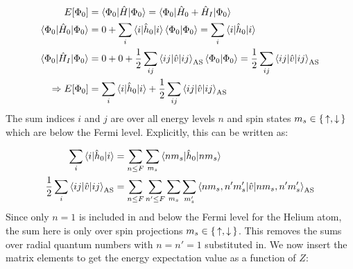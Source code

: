 \documentclass{article}
\newcommand{\inner}[3]{\braket{#1|#2|#3}}
\newcommand{\innerAS}[3]{\inner{#1}{#2}{#3}_{\text{AS}}}
\newcommand{\hnull}{\hat{h}_0}
\begin{document}
    \begin{align}
        E[\Phi_0] &= \inner{\Phi_0}{\hat{H}}{\Phi_0} = \inner{\Phi_0}{\hat{H}_0 + \hat{H}_I}{\Phi_0} \nonumber \\ 
        \inner{\Phi_0}{\hat{H}_0}{\Phi_0} &= 0 + \sum_i \inner{i}{\hnull}{i} \braket{\Phi_0 | \Phi_0} = \sum_i \inner{i}{\hnull}{i}\nonumber \\
        \inner{\Phi_0}{\hat{H}_I}{\Phi_0} &= 0 + 0 + \frac{1}{2}\sum_{ij} \innerAS{ij}{\hat{v}}{ij}\braket{\Phi_0|\Phi_0} = \frac{1}{2}\sum_{ij} \innerAS{ij}{\hat{v}}{ij} \nonumber\\
        \Rightarrow E[\Phi_0] &= \sum_i \inner{i}{\hnull}{i} + \frac{1}{2}\sum_{ij} \innerAS{ij}{\hat{v}}{ij} \label{eq:phi0_phi0}
    \end{align}
    The sum indices $i$ and $j$ are over all energy levels $n$ and spin states $m_s \in \set{\uparrow, \downarrow}$ which are below the Fermi level. Explicitly, this can be written as:

    \begin{align*}
        \sum_i \inner{i}{\hnull}{i} &= \sum_{n \leq F}\sum_{m_s} \inner{n m_s}{\hnull}{n m_s} \nonumber \\
        \frac{1}{2}\sum_i \innerAS{ij}{\hat{v}}{ij} &= \sum_{n \leq F}\sum_{n' \leq F} \sum_{m_s} \sum_{m_s'} \innerAS{nm_s, n' m_s'}{\hat{v}}{nm_s, n' m_s'}
    \end{align*}
    Since only $n=1$ is included in and below the Fermi level for the Helium atom, the sum here is only over spin projections $m_s \in \set{\uparrow, \downarrow}$. This removes the sums over radial quantum numbers with $n = n' = 1$ substituted in.  We now insert the matrix elements to get the energy expectation value as a function of $Z$:
\end{document}
